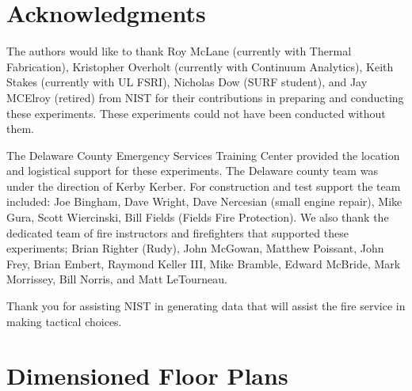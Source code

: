 \documentclass[12pt,oneside]{book}
\begin{document}
\chapter{Acknowledgments}
\label{chap:acknowledgments}

The authors would like to thank Roy McLane (currently with Thermal Fabrication), Kristopher Overholt (currently with Continuum Analytics), Keith Stakes (currently with UL FSRI), Nicholas Dow (SURF student), and Jay MCElroy (retired) from NIST for their contributions in preparing and conducting these experiments. These experiments could not have been conducted without them. 

The Delaware County Emergency Services Training Center provided the location and logistical support for these experiments.  The Delaware county team was under the direction of Kerby Kerber.  For construction and test support the team included: Joe Bingham, Dave Wright, Dave Nercesian (small engine repair), Mike Gura, Scott Wiercinski, Bill Fields (Fields Fire Protection).  We also thank the dedicated team of fire instructors and firefighters that supported these experiments; Brian Righter (Rudy), John McGowan, Matthew Poissant, John Frey, Brian Embert, Raymond Keller III, Mike Bramble, Edward McBride, Mark Morrissey, Bill Norris, and Matt LeTourneau.

Thank you for assisting NIST in generating data that will assist the fire service in making tactical choices.





\appendix
\chapter{Dimensioned Floor Plans}
\label{chap:floor_plans}
\end{document}

